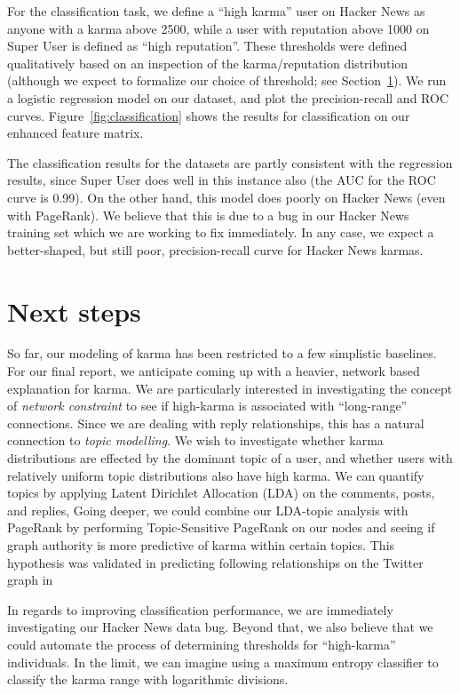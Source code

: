 \documentclass[10pt]{article}
\begin{document}
For the classification task, we define a ``high karma'' user on Hacker News as
anyone with a karma above 2500, while a user with reputation above 1000 on Super
User is defined as ``high reputation''. These thresholds were defined
qualitatively based on an inspection of the karma/reputation distribution
(although we expect to formalize our choice of threshold; see
Section~\ref{sec:next-steps}). We run a logistic regression model on our dataset,
and plot the precision-recall and ROC curves. Figure~\ref{fig:classification}
shows the results for classification on our enhanced feature matrix.

The classification results for the datasets are partly consistent with the
regression results, since Super User does well in this instance also (the AUC
for the ROC curve is 0.99). On the other hand, this model does poorly on Hacker
News (even with PageRank). We believe that this is due to a bug in our Hacker News
training set which we are working to fix immediately. In any case, we
expect a better-shaped, but still poor, precision-recall curve for Hacker News
karmas.

\section{Next steps}
\label{sec:next-steps}
So far, our modeling of karma has been restricted to a few simplistic baselines.
For our final report, we anticipate coming up with a heavier, network based
explanation for karma. We are particularly interested in investigating the concept of
\emph{network constraint} to see if high-karma is associated with ``long-range''
connections. Since we are dealing with reply relationships, this has a natural
connection to \textit{topic modelling}. We wish to investigate whether karma
distributions are effected by the dominant topic of a user, and whether users with
relatively uniform topic distributions also have high karma. We can quantify
topics by applying Latent Dirichlet Allocation (LDA) \citep{blei2003latent}
on the comments, posts, and replies, Going deeper, we could combine our LDA-topic analysis with PageRank by
performing Topic-Sensitive PageRank \citep{haveliwala2002topic} on our nodes
and seeing if graph authority is more predictive of karma within certain
topics. This hypothesis was validated in predicting following relationships
on the Twitter graph in \citet{weng2010twitterrank}

In regards to improving classification performance, we are immediately
investigating our Hacker News data bug. Beyond that, we also believe that
we could automate the process of determining thresholds for ``high-karma''
individuals. In the limit, we can imagine using a maximum entropy classifier
to classify the karma range with logarithmic divisions.
\end{document}
